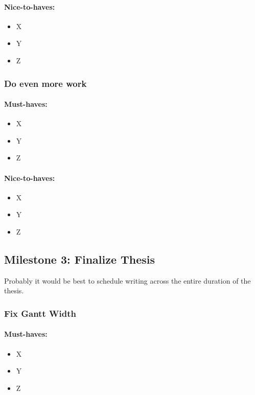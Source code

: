 \documentclass[expose, en]{thesis}
\begin{document}
\paragraph{Nice-to-haves:}
\begin{itemize}
    \item X
    \item Y
    \item Z
\end{itemize}


\subsubsection{Do even more work}
\label{sec:task4}
\lipsum[1]

\paragraph{Must-haves:}
\begin{itemize}
    \item X
    \item Y
    \item Z
\end{itemize}

\paragraph{Nice-to-haves:}
\begin{itemize}
    \item X
    \item Y
    \item Z
\end{itemize}
\clearpage

\subsection{Milestone 3: Finalize Thesis}

Probably it would be best to schedule writing across the entire duration
of the thesis.

\subsubsection{Fix Gantt Width}
\label{sec:task5}
\lipsum[1]

\paragraph{Must-haves:}
\begin{itemize}
    \item X
    \item Y
    \item Z
\end{itemize}
\end{document}
